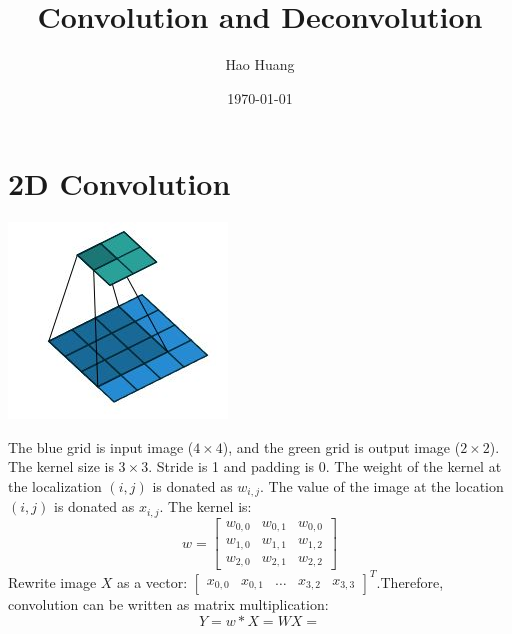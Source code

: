 \documentclass{article}
\title{Convolution and Deconvolution}
\begin{document}
\begin{titlepage}
\author{Hao Huang}
\date{\today}
\maketitle
\end{titlepage}

\tableofcontents
\newpage

\section{2D Convolution}
\begin{center}
\includegraphics[scale=0.7]{conv}
\end{center}
The blue grid is input image ($4\times 4$), and the green grid is output image ($2\times 2$). The kernel size is $3\times 3$. Stride is 1 and padding is 0. The weight of the kernel at the localization $(i, j)$ is donated as $w_{i, j}$. The value of the image at the location $(i, j)$ is donated as $x_{i,j}$.
The kernel is:
\[
w=
\begin{bmatrix}
w_{0,0} & w_{0,1} & w_{0,0} \\ 
w_{1,0} & w_{1,1} & w_{1,2} \\
w_{2,0} & w_{2,1} & w_{2,2} 
\end{bmatrix}
\]
Rewrite image $X$ as a vector:
$
\begin{bmatrix}
x_{0,0} & x_{0,1} & \dots & x_{3,2} & x_{3,3} 
\end{bmatrix}^T
$.Therefore, convolution can be written as matrix multiplication:
\[
Y=w*X=WX=
\]
\end{document}
